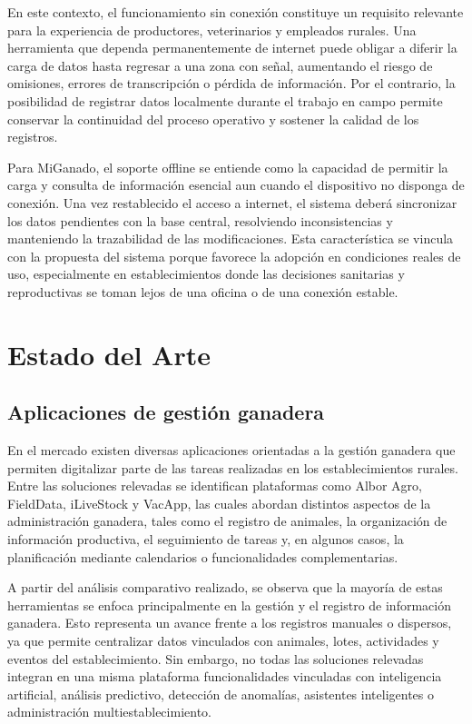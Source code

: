 En este contexto, el funcionamiento sin conexi\'on constituye un requisito relevante para la experiencia de productores, veterinarios y empleados rurales. Una herramienta que dependa permanentemente de internet puede obligar a diferir la carga de datos hasta regresar a una zona con se\~nal, aumentando el riesgo de omisiones, errores de transcripci\'on o p\'erdida de informaci\'on. Por el contrario, la posibilidad de registrar datos localmente durante el trabajo en campo permite conservar la continuidad del proceso operativo y sostener la calidad de los registros.

Para MiGanado, el soporte offline se entiende como la capacidad de permitir la carga y consulta de informaci\'on esencial aun cuando el dispositivo no disponga de conexi\'on. Una vez restablecido el acceso a internet, el sistema deber\'a sincronizar los datos pendientes con la base central, resolviendo inconsistencias y manteniendo la trazabilidad de las modificaciones. Esta caracter\'istica se vincula con la propuesta del sistema porque favorece la adopci\'on en condiciones reales de uso, especialmente en establecimientos donde las decisiones sanitarias y reproductivas se toman lejos de una oficina o de una conexi\'on estable.

\section{Estado del Arte}

\subsection{Aplicaciones de gesti\'on ganadera}

En el mercado existen diversas aplicaciones orientadas a la gesti\'on ganadera que permiten digitalizar parte de las tareas realizadas en los establecimientos rurales. Entre las soluciones relevadas se identifican plataformas como Albor Agro, FieldData, iLiveStock y VacApp, las cuales abordan distintos aspectos de la administraci\'on ganadera, tales como el registro de animales, la organizaci\'on de informaci\'on productiva, el seguimiento de tareas y, en algunos casos, la planificaci\'on mediante calendarios o funcionalidades complementarias.

A partir del an\'alisis comparativo realizado, se observa que la mayor\'ia de estas herramientas se enfoca principalmente en la gesti\'on y el registro de informaci\'on ganadera. Esto representa un avance frente a los registros manuales o dispersos, ya que permite centralizar datos vinculados con animales, lotes, actividades y eventos del establecimiento. Sin embargo, no todas las soluciones relevadas integran en una misma plataforma funcionalidades vinculadas con inteligencia artificial, an\'alisis predictivo, detecci\'on de anomal\'ias, asistentes inteligentes o administraci\'on multiestablecimiento.

